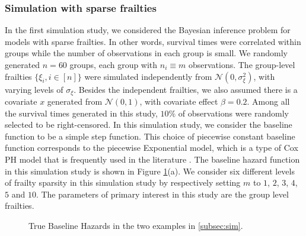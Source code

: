 \documentclass[ba]{imsart}
\begin{document}
\subsubsection{Simulation with sparse frailties}\label{subsubsec:sim1}

In the first simulation study, we considered the Bayesian inference problem for models with sparse frailties. In other words, survival times were correlated within groups while the number of observations in each group is small. We randomly generated $n = 60$ groups, each group with $n_i \equiv m$ observations. The group-level frailties $\{\xi_i, i\in [n] \}$ were simulated independently from $\mathcal{N}(0,\sigma_\xi^{2})$, with varying levels of $\sigma_{\xi}$. Besides the independent frailties, we also assumed there is a covariate $x$ generated from $\mathcal{N}(0,1)$, with covariate effect $\beta = 0.2$. Among all the survival times generated in this study, $10\%$ of observations were randomly selected to be right-censored. In this simulation study, we consider the baseline function to be a simple step function. This choice of piecewise constant baseline function corresponds to the piecewise Exponential model, which is a type of Cox PH model that is frequently used in the literature \citep{piecewiseExp}.
The baseline hazard function in this simulation study is shown in Figure \ref{fig:truebase}(a). We consider six different levels of frailty sparsity in this simulation study by respectively setting $m$ to $1$, $2$, $3$, $4$, $5$ and $10$. The parameters of primary interest in this study are the group level frailties.


\begin{figure}[h]
\centering
{}
\caption{True Baseline Hazards in the two examples in \ref{subsec:sim}.}
\label{fig:truebase}
\end{figure}
\end{document}
